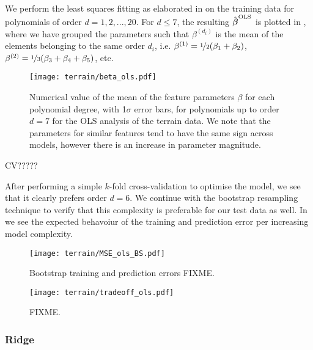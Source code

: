         We perform the least squares fitting as elaborated in  on the training data for polynomials of order $d=1,2,..., 20$. For $d\leq 7$, the resulting $\hat{\boldsymbol{\beta}}^\text{OLS}$ is plotted in , where we have grouped the parameters such that $\beta^{(d_i)}$ is the mean of the elements belonging to the same order $d_i$, i.e. $\beta^{(1)} = \nicefrac{1}{2}(\beta_1 + \beta_2)$, $\beta^{(2)} = \nicefrac{1}{3}(\beta_3 + \beta_4 + \beta_5)$, etc. 

        \begin{figure}
            \texttt{[image: terrain/beta\_ols.pdf]}
            \caption{Numerical value of the mean of the feature parameters $\beta$ for each polynomial degree, with 1$\sigma$ error bars, for polynomials up to order $d=7$ for the OLS analysis of the terrain data. We note that the parameters for similar features tend to have the same sign across models, however there is an increase in parameter magnitude.}
            \label{fig:gc_beta_with_standard_deviation}
        \end{figure}

        CV?????

        After performing a simple $k$-fold cross-validation to optimise the model, we see that it clearly prefers order $d=6$. We continue with the bootstrap resampling technique to verify that this complexity is preferable for our test data as well. In  we see the expected behavoiur of the training and prediction error per increasing model complexity.
        

        \begin{figure}
            \texttt{[image: terrain/MSE\_ols\_BS.pdf]}
            \caption{Bootstrap training and prediction errors FIXME.}
            \label{fig:gc_model_complexity}
        \end{figure}

        

        \begin{figure}
            \texttt{[image: terrain/tradeoff\_ols.pdf]}
            \caption{FIXME.}
            \label{fig:gc_bias_variance_ols}
        \end{figure}


        \subsubsection{Ridge}\label{sec:gc_ridgeanalysis}


